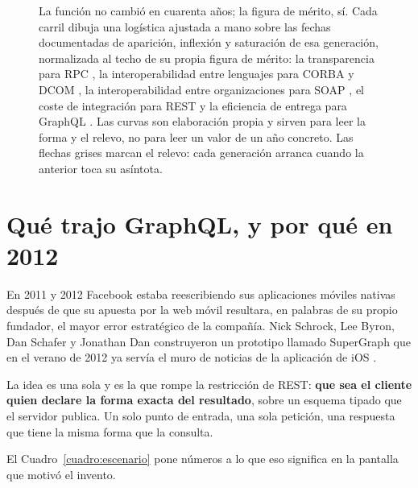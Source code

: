 \documentclass[11pt,letterpaper]{article}
\newcommand{\gx}[1]{((#1)-1980)*0.2385}
\begin{document}
\begin{figure}[!htb]
\caption{La función no cambió en cuarenta años; la figura de mérito, sí. Cada
carril dibuja una logística ajustada a mano sobre las fechas documentadas de
aparición, inflexión y saturación de esa generación, normalizada al techo de su
propia figura de mérito: la transparencia para RPC \parencite{birrell1984}, la
interoperabilidad entre lenguajes para CORBA y DCOM \parencite{wikicorba}, la
interoperabilidad entre organizaciones para SOAP \parencite{w3c2003soap}, el
coste de integración para REST \parencite{fielding2000} y la eficiencia de
entrega para GraphQL \parencite{graphql2015}. Las curvas son elaboración propia
y sirven para leer la forma y el relevo, no para leer un valor de un año
concreto. Las flechas grises marcan el relevo: cada generación arranca cuando
la anterior toca su asíntota.}
\label{fig:curvass}
\end{figure}

\section{Qué trajo GraphQL, y por qué en 2012}

En 2011 y 2012 Facebook estaba reescribiendo sus aplicaciones móviles nativas
después de que su apuesta por la web móvil resultara, en palabras de su propio
fundador, el mayor error estratégico de la compañía. Nick Schrock, Lee Byron,
Dan Schafer y Jonathan Dan construyeron un prototipo llamado SuperGraph que en
el verano de 2012 ya servía el muro de noticias de la aplicación de iOS
\parencite{postman2024historia}.

La idea es una sola y es la que rompe la restricción de REST: \textbf{que sea
el cliente quien declare la forma exacta del resultado}, sobre un esquema
tipado que el servidor publica. Un solo punto de entrada, una sola petición,
una respuesta que tiene la misma forma que la consulta.

El Cuadro~\ref{cuadro:escenario} pone números a lo que eso significa en la
pantalla que motivó el invento.
\end{document}
